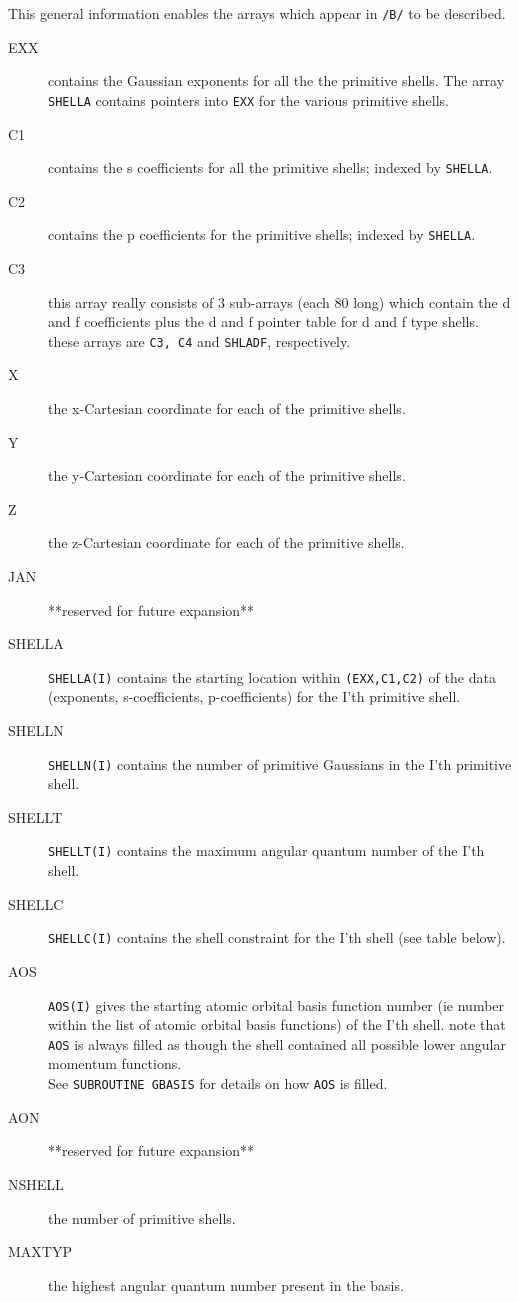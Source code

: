 This general information enables the
arrays which appear in {\tt /B/} to be described.
\newpage
\begin{description}
\item[EXX] contains the Gaussian exponents for all the
 the primitive shells.  The array {\tt SHELLA}
 contains pointers into {\tt EXX} for the various
 primitive shells.
\item[C1] contains the s coefficients for all the primitive
 shells;  indexed by {\tt SHELLA}.
\item[C2] contains the p coefficients for the primitive
 shells;  indexed by {\tt SHELLA}.
\item[C3] this array really consists of 3 sub-arrays
 (each 80  long) which contain the
 d and f coefficients plus the d and f
 pointer table for d and f type shells.
 these arrays are {\tt C3, C4} and {\tt SHLADF}, respectively.
\item[X] the x-Cartesian coordinate for each of the
 primitive shells.
\item[Y] the y-Cartesian coordinate for each of the
 primitive shells.
\item[Z] the z-Cartesian coordinate for each of the
 primitive shells.
\item[JAN] **reserved for future expansion**
\item[SHELLA] {\tt SHELLA(I)} contains the starting location
 within {\tt (EXX,C1,C2)} of the data
 (exponents, s-coefficients, p-coefficients)
 for the I'th primitive shell.
\item[SHELLN] {\tt SHELLN(I)} contains the number of primitive
 Gaussians in the I'th primitive shell.
\item[SHELLT] {\tt SHELLT(I)} contains the maximum angular quantum number
 of the I'th shell.
\item[SHELLC] {\tt SHELLC(I)} contains the shell constraint for the I'th
 shell (see table below).
\item[AOS] {\tt AOS(I)} gives the starting atomic orbital basis
 function number (ie number within the list
 of atomic orbital basis functions) of the
 I'th shell.  note that {\tt AOS} is always filled
 as though the shell contained all possible
 lower angular momentum functions. \\  
See {\tt SUBROUTINE GBASIS} for details on how {\tt AOS} is filled.
\item[AON] **reserved for future expansion**
\item[NSHELL] the number of primitive shells.
\item[MAXTYP] the highest angular quantum number present
 in the basis.
\end{description}
